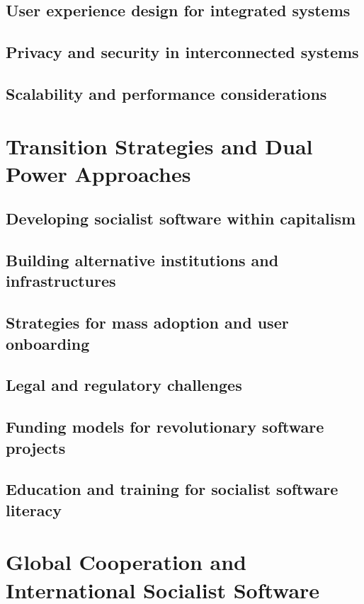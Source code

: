 \subsection{User experience design for integrated systems}
\subsection{Privacy and security in interconnected systems}
\subsection{Scalability and performance considerations}

\newpage

\section{Transition Strategies and Dual Power Approaches}
\subsection{Developing socialist software within capitalism}
\subsection{Building alternative institutions and infrastructures}
\subsection{Strategies for mass adoption and user onboarding}
\subsection{Legal and regulatory challenges}
\subsection{Funding models for revolutionary software projects}
\subsection{Education and training for socialist software literacy}

\newpage

\section{Global Cooperation and International Socialist Software}
